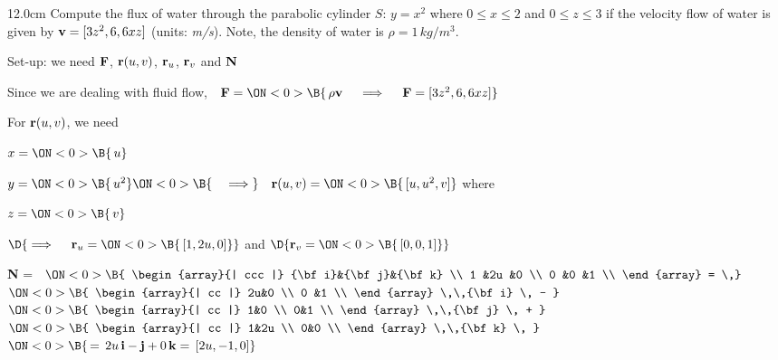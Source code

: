 \begin{frame}
\begin{columns}\begin{column}{12.0cm}
\scriptsize
\EX Compute the flux of water through the parabolic cylinder $S:\, y=x^2$ where $0 \le x \le 2$ and $0 \le z \le 3$ if the velocity flow of water is given by ${\bf v} = [3z^2, 6, 6xz]$ (units: {\em m/s}).  Note, the density of water is $\rho = 1 \, kg/m^3$.

\vspace{0.3cm}

Set-up: we need ${\bf F}$, ${\bf r}(u,v)$, ${\bf r}_u$, ${\bf r}_v$ and ${\bf N}$

\vspace{0.4cm}

Since we are dealing with fluid flow, \,\, ${\bf F} = 
\ON<0>{\B{\, \rho{\bf v} \quad \implies \quad {\bf F} = [3z^2, 6, 6xz]}}$

\vspace{0.3cm}

For ${\bf r}(u,v)$, we need

\vspace{0.2cm}

\quad $
x =
\ON<0>{\B{\,u}}$

\quad $
y =
\ON<0>{\B{\,u^2}}
\ON<0>{\B{\quad \implies}} \quad {\bf r}(u,v) =
\ON<0>{\B{\, [u,u^2,v]}}$ \qquad where 

\quad $
z =
\ON<0>{\B{\,v}}$

\vspace{0.2cm}
\hspace{1.3cm} $\D{
\implies \quad {\bf r}_u =
\ON<0>{\B{\, [1,2u,0]}}}$ \qquad 
and
\qquad $\D{
{\bf r}_v = 
\ON<0>{\B{\,[0,0,1]}}}$

\vspace{0.3cm}

{\bf N} = \,
$\ON<0>{\B{
\begin{array}{| ccc |}
	{\bf i}&{\bf j}&{\bf k} \\
	1      &2u     &0 \\
 	0      &0      &1 \\
\end{array}
= \,}}$
$\ON<0>{\B{
\begin{array}{| cc |}
		  2u&0 \\
 		  0 &1 \\
\end{array}
 \,\,{\bf i} \, - }}$\,\,
$\ON<0>{\B{
\begin{array}{| cc |}
		  1&0 \\
 		  0&1 \\
\end{array}
 \,\,{\bf j} \, + }}$\,\,
$\ON<0>{\B{
\begin{array}{| cc |}
		  1&2u \\
 		  0&0 \\
\end{array}
\,\,{\bf k} \, }}$
$
\ON<0>{\B{\, = \, 2u \,{\bf i} - {\bf j} + 0\,{\bf k} = \, [2u,-1,0]}}$


\end{column}
\end{columns}
\end{frame}
